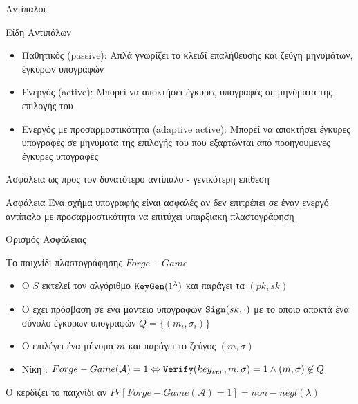\documentclass[handout]{beamer}
\begin{document}
\begin{frame}[allowframebreaks]{Αντίπαλοι}
\begin{block}{Είδη Αντιπάλων}
\begin{itemize}
\item Παθητικός (passive): Απλά γνωρίζει το κλειδί επαλήθευσης και ζεύγη μηνυμάτων, έγκυρων υπογραφών
\item Ενεργός (active): Μπορεί να αποκτήσει έγκυρες υπογραφές σε μηνύματα της επιλογής του
\item Ενεργός με προσαρμοστικότητα (adaptive active): Μπορεί να αποκτήσει έγκυρες υπογραφές σε μηνύματα της επιλογής του που εξαρτώνται από προηγουμενες έγκυρες υπογραφές
\end{itemize}
\end{block}
\framebreak
Ασφάλεια ως προς τον δυνατότερο αντίπαλο - γενικότερη επίθεση

\begin{block}{Ασφάλεια}
Ένα σχήμα υπογραφής είναι ασφαλές αν δεν επιτρέπει σε έναν ενεργό αντίπαλο με προσαρμοστικότητα να επιτύχει υπαρξιακή πλαστογράφηση 
\end{block}
\end{frame}


\begin{frame}{Ορισμός Ασφάλειας}
\begin{block}{Το παιχνίδι πλαστογράφησης $Forge-Game$}
\begin{itemize}
\item Ο $S$ εκτελεί τον αλγόριθμο $\mathtt{KeyGen}(1^\lambda)$ και παράγει τα $(pk,sk)$
\pause
\item Ο \adv έχει πρόσβαση σε ένα μαντειο υπογραφών $\mathtt{Sign}(sk,\cdot)$ με το οποίο αποκτά ένα σύνολο έγκυρων υπογραφών $Q = \{(m_i, \sigma_i)\}$ \\
\pause
{}
\pause
\item O \adv επιλέγει ένα μήνυμα $m$ και παράγει το ζεύγος $(m, \sigma)$ 
\pause
\item Νίκη \adv: $Forge-Game(\mathcal{A}) = 1 \Leftrightarrow \mathtt{Verify}(key_{ver}, m, \sigma)=1 \wedge (m, \sigma) \not \in Q$
\end{itemize}
\end{block}
\pause
O \adv κερδίζει το παιχνίδι αν $Pr[Forge-Game(\mathcal{A})=1] = non-negl(\lambda)$
\end{frame}
\end{document}
